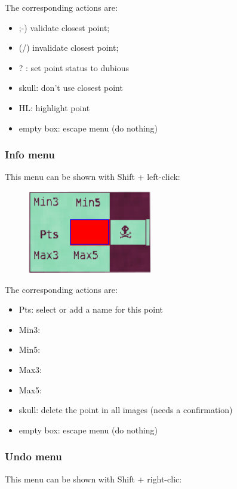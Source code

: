 The corresponding actions are:
\begin{itemize}
\item ;-) validate closest point;
\item (/) invalidate closest point;
\item ? : set point status to dubious
\item skull: don't use closest point
\item HL: highlight point
\item empty box: escape menu (do nothing)
\end{itemize}


\subsubsection{Info menu}

This menu can be shown with Shift + left-click:
\begin{figure}[H]
\begin{center}
\includegraphics[width=154pt]{FIGS/Saisie/info.png}
\end{center}
\label{FIG:info}
\end{figure}

The corresponding actions are:
\begin{itemize}
\item Pts: select or add a name for this point
\item Min3:
\item Min5:
\item Max3:
\item Max5:
\item skull: delete the point in all images (needs a confirmation)
\item empty box: escape menu (do nothing)
\end{itemize}

\subsubsection{Undo menu}

This menu can be shown with Shift + right-clic:


